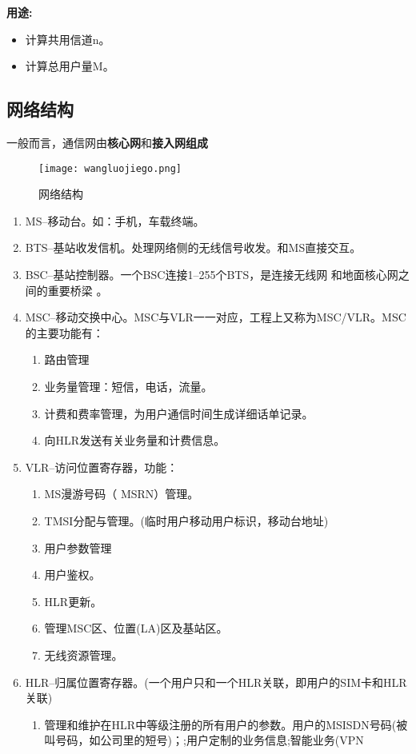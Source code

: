 	 \textbf{用途:}\\
	 \begin{itemize}
	 	\item 计算共用信道n。
	 	\item 计算总用户量M。
	 \end{itemize}
	\subsection{网络结构}
	一般而言，通信网由\textbf{核心网}和\textbf{接入网组成}
	\begin{figure}[H]
		\centering
		\texttt{[image: wangluojiego.png]}
		\caption{网络结构}
	\end{figure}
	\begin{enumerate}
		\item MS--移动台。如：手机，车载终端。
		\item BTS--基站收发信机。处理网络侧的无线信号收发。和MS直接交互。
		\item BSC--基站控制器。一个BSC连接1--255个BTS，是连接无线网
		和地面核心网之间的重要桥梁
		。
		\item MSC--移动交换中心。MSC与VLR一一对应，工程上又称为MSC/VLR。MSC的主要功能有：
		\begin{enumerate}
			\item 路由管理
			\item 业务量管理：短信，电话，流量。
			\item 计费和费率管理，为用户通信时间生成详细话单记录。
			\item 向HLR发送有关业务量和计费信息。
		\end{enumerate}
		\item VLR--访问位置寄存器，功能：
		\begin{enumerate}
			\item MS漫游号码（ MSRN）管理。
			\item TMSI分配与管理。(临时用户移动用户标识，移动台地址)
			\item 用户参数管理
			\item 用户鉴权。
			\item HLR更新。
			\item 管理MSC区、位置(LA)区及基站区。
			\item 无线资源管理。
		\end{enumerate}
		\item HLR--归属位置寄存器。(一个用户只和一个HLR关联，即用户的SIM卡和HLR关联)
		\begin{enumerate}
			\item 管理和维护在HLR中等级注册的所有用户的参数。用户的MSISDN号码(被叫号码，如公司里的短号)；;用户定制的业务信息;智能业务(VPN

\end{enumerate}
\end{enumerate}
